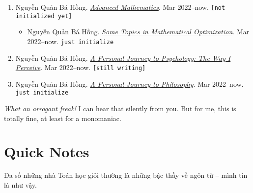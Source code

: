 \documentclass{article}
\numberwithin{equation}{section}
\begin{document}
\begin{enumerate}
\begin{itemize}
	\end{itemize}
	\item Nguyễn Quản Bá Hồng. \href{https://github.com/NQBH/hobby/tree/master/advanced_mathematics}{\textit{Advanced Mathematics}}. Mar 2022--now. \texttt{[not initialized yet]}
	\begin{itemize}
		\item Nguyễn Quản Bá Hồng. \href{https://github.com/NQBH/hobby/blob/master/advanced_mathematics/mathematical_optimization/NQBH_mathematical_optimization.pdf}{\textit{Some Topics in Mathematical Optimization}}. Mar 2022--now. \texttt{just initialize}
	\end{itemize}
	\item Nguyễn Quản Bá Hồng. \href{https://github.com/NQBH/hobby/blob/master/psychology/NQBH_a_personal_journey_to_psychology.pdf}{\textit{A Personal Journey to Psychology: The Way I Perceive}}. Mar 2022--now. \texttt{[still writing]}
	\item Nguyễn Quản Bá Hồng. \href{https://github.com/NQBH/hobby/blob/master/philosophy/NQBH_a_personal_journey_to_philosophy.pdf}{\textit{A Personal Journey to Philosophy}}. Mar 2022--now. \texttt{just initialize}
\end{enumerate}
\textit{What an arrogant freak!} I can hear that silently from you. But for me, this is totally fine, at least for a monomaniac.

\section{Quick Notes}
Đa số những nhà Toán học giỏi thường là những bậc thầy về ngôn từ -- mình tin là như vậy.

\appendix

\printbibliography[heading=bibintoc]
	
\end{document}

